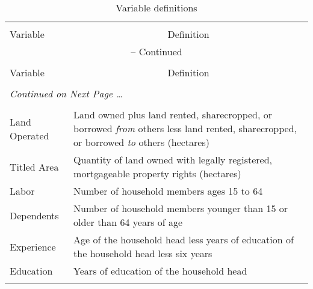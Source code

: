 \documentclass[english]{article}
\begin{document}
\footnotesize
\begin{longtable}{l  p{10.5cm}}
\caption[Variable definitions]{Variable definitions} \\[-2ex] 

\hline \hline \\[-5ex]
\multicolumn{1}{l}{Variable} &
\multicolumn{1}{c}{Definition}\\[0.0ex]   \hline
\endfirsthead

\multicolumn{2}{c}{\normalsize{\tablename} \thetable{} -- Continued} \\
\hline \hline \\[-5ex]
\multicolumn{1}{l}{Variable} &
\multicolumn{1}{c}{Definition}\\[0.0ex]  
  \\[-4.5ex]
\endhead

\multicolumn{2}{l}{{\textit{Continued on Next Page \ldots}}} \\
\endfoot

  \\[-1.8ex]
\endlastfoot

Land Operated & Land owned plus land rented, sharecropped, or borrowed 
\emph{from} others less land rented, sharecropped, or borrowed \emph{to} 
others (hectares) \\

Titled Area & Quantity of land owned with legally registered, mortgageable 
property rights (hectares)\\

Labor  & Number of household members ages 15 to 64 \\

Dependents & Number of household members younger than 15 or older than 
64 years of age \\ 

Experience & Age of the household head less years of education of the 
household head less six years \\ 

Education & Years of education of the household head \\ \hline

\label{def}
\end{longtable}
\normalsize
\end{document}
